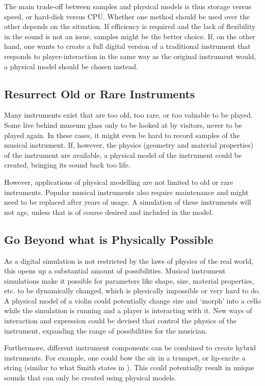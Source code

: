 The main trade-off between samples and physical models is thus storage versus speed, or hard-disk versus CPU. Whether one method should be used over the other depends on the situation. If efficiency is required and the lack of flexibility in the sound is not an issue, samples might be the better choice. If, on the other hand, one wants to create a full digital version of a traditional instrument that responds to player-interaction in the same way as the original instrument would, a physical model should be chosen instead.

\subsection{Resurrect Old or Rare Instruments}
Many instruments exist that are too old, too rare, or too valuable to be played. Some live behind museum glass only to be looked at by visitors, never to be played again. In these cases, it might even be hard to record samples of the musical instrument. If, however, the physics (geometry and material properties) of the instrument are available, a physical model of the instrument could be created, bringing its sound back too life.

However, applications of physical modelling are not limited to old or rare instruments. Popular musical instruments also require maintenance and might need to be replaced after years of usage. A simulation of these instruments will not age, unless that is of course desired and included in the model.

\subsection{Go Beyond what is Physically Possible}\label{sec:impossible}
As a digital simulation is not restricted by the laws of physics of the real world, this opens up a substantial amount of possibilities.
Musical instrument simulations make it possible for parameters like shape, size, material properties, etc. to be dynamically changed, which is physically impossible or very hard to do. A physical model of a violin could potentially change size and `morph' into a cello while the simulation is running and a player is interacting with it. New ways of interaction and expression could be devised that control the physics of the instrument, expanding the range of possibilities for the musician. 

Furthermore, different instrument components can be combined to create hybrid instruments. For example, one could bow the air in a trumpet, or lip-excite a string (similar to what Smith states in \cite{Smith2010a}). This could potentially result in unique sounds that can only be created using physical models.

